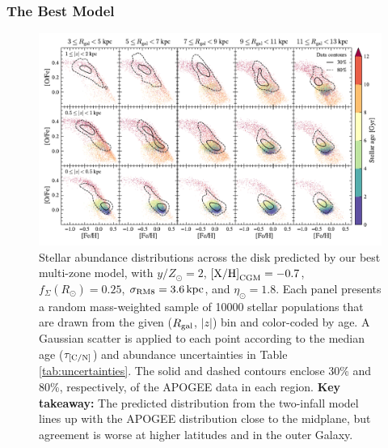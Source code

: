 \documentclass[twocolumn,twocolappendix,linenumbers]{aastex631}
\newcommand{\yZ}[1]{$y/Z_\odot=#1$}
\newcommand{\kpc}{\,{\rm kpc}}
\begin{document}
\subsubsection{The Best Model}
\label{sec:ofe-feh-best}

\begin{figure}
    \centering
    \includegraphics[width=\textwidth]{figures/ofe_feh_best.pdf}
    \caption{Stellar abundance distributions across the disk predicted by our best multi-zone model, with \yZ{2}, ${\rm [X/H]}_{\rm CGM}=-0.7$, $f_\Sigma(R_\odot)=0.25$, $\sigma_{\rm RM8}=3.6\kpc$, and $\eta_\odot=1.8$. Each panel presents a random mass-weighted sample of \num{10000} stellar populations that are drawn from the given ($R_{\rm gal}$, $|z|$) bin and color-coded by age. A Gaussian scatter is applied to each point according to the median age ($\tau_{\rm [C/N]}$) and abundance uncertainties in Table \ref{tab:uncertainties}. The solid and dashed contours enclose 30\% and 80\%, respectively, of the APOGEE data in each region. {\bf Key takeaway:} The predicted distribution from the two-infall model lines up with the APOGEE distribution close to the midplane, but agreement is worse at higher latitudes and in the outer Galaxy.}
    \label{fig:ofe-feh-best}
\end{figure}
\end{document}
